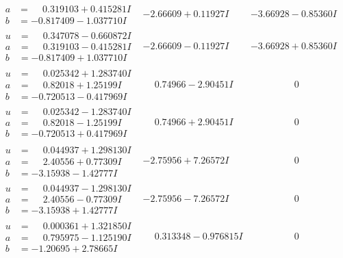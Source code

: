 \documentclass[1p]{elsarticle_modified}
\theoremstyle{definition}
\begin{document}
$$\begin{array}{c|c|c}
\begin{aligned}
a &= \phantom{-}0.319103 + 0.415281 I \\
b &= -0.817409 - 1.037710 I\end{aligned}
 & -2.66609 + 0.11927 I & -3.66928 - 0.85360 I \\ \hline\begin{aligned}
u &= \phantom{-}0.347078 - 0.660872 I \\
a &= \phantom{-}0.319103 - 0.415281 I \\
b &= -0.817409 + 1.037710 I\end{aligned}
 & -2.66609 - 0.11927 I & -3.66928 + 0.85360 I \\ \hline\begin{aligned}
u &= \phantom{-}0.025342 + 1.283740 I \\
a &= \phantom{-}0.82018 + 1.25199 I \\
b &= -0.720513 - 0.417969 I\end{aligned}
 & \phantom{-}0.74966 - 2.90451 I & \phantom{-0.000000 } 0 \\ \hline\begin{aligned}
u &= \phantom{-}0.025342 - 1.283740 I \\
a &= \phantom{-}0.82018 - 1.25199 I \\
b &= -0.720513 + 0.417969 I\end{aligned}
 & \phantom{-}0.74966 + 2.90451 I & \phantom{-0.000000 } 0 \\ \hline\begin{aligned}
u &= \phantom{-}0.044937 + 1.298130 I \\
a &= \phantom{-}2.40556 + 0.77309 I \\
b &= -3.15938 - 1.42777 I\end{aligned}
 & -2.75956 + 7.26572 I & \phantom{-0.000000 } 0 \\ \hline\begin{aligned}
u &= \phantom{-}0.044937 - 1.298130 I \\
a &= \phantom{-}2.40556 - 0.77309 I \\
b &= -3.15938 + 1.42777 I\end{aligned}
 & -2.75956 - 7.26572 I & \phantom{-0.000000 } 0 \\ \hline\begin{aligned}
u &= \phantom{-}0.000361 + 1.321850 I \\
a &= \phantom{-}0.795975 - 1.125190 I \\
b &= -1.20695 + 2.78665 I\end{aligned}
 & \phantom{-}0.313348 - 0.976815 I & \phantom{-0.000000 } 0 \\ \hline\begin{aligned}

\end{aligned}
\end{array}$$
\end{document}
